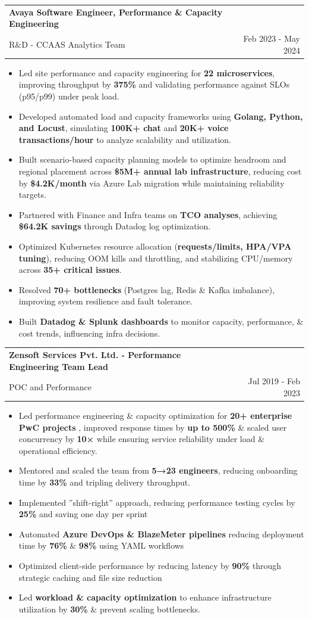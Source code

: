 \documentclass[letterpaper,11pt]{article}
\makeatletter
\newcommand{\resumeItem}[1]{
  \item\small{{#1 \vspace{-1pt}}}
}
\newcommand{\resumeSubheading}[4]{
  \vspace{-2pt}\item
  \begin{tabular*}{1.0\textwidth}[t]{l@{\extracolsep{\fill}}r}
    \textbf{\large#1} & \textbf{\small #2} \\
    \normalsize{\large#3} & \normalsize{\small #4} \\
  \end{tabular*}\vspace{-7pt}
}
\newcommand{\resumeItemListStart}{\begin{itemize}[leftmargin=0.1in]}
\newcommand{\resumeItemListEnd}{\end{itemize}\vspace{-12pt}}
\makeatother
\begin{document}
\resumeSubheading
  {Avaya Software Engineer, Performance \& Capacity Engineering }{}
  {R\&D - CCAAS Analytics Team}{Feb 2023 - May 2024}
\resumeItemListStart
  \resumeItem{\normalsize{Led site performance and capacity engineering for 
  \textbf{22 microservices}, improving throughput by \textbf{375\%} and 
  validating performance against SLOs (p95/p99) under peak load.}}
  \resumeItem{\normalsize{Developed automated load and capacity frameworks 
  using \textbf{Golang, Python, and Locust}, simulating \textbf{100K+ chat} 
  and \textbf{20K+ voice transactions/hour} to analyze scalability and utilization.}}
  \resumeItem{\normalsize{Built scenario-based capacity planning models to optimize headroom 
  and regional placement across \textbf{\$5M+ annual lab infrastructure}, 
  reducing cost by \textbf{\$4.2K/month} via Azure Lab migration while 
  maintaining reliability targets.}}
  \resumeItem{\normalsize{Partnered with Finance and Infra teams 
  on \textbf{TCO analyses}, achieving \textbf{\$64.2K savings} 
  through Datadog log optimization.}}
  \resumeItem{\normalsize{Optimized Kubernetes resource allocation 
  (\textbf{requests/limits, HPA/VPA tuning}), reducing OOM kills and throttling, 
  and stabilizing CPU/memory across \textbf{35+ critical issues}.}}
  \resumeItem{\normalsize{Resolved \textbf{70+ bottlenecks} 
  (Postgres lag, Redis \& Kafka imbalance), improving 
  system resilience and fault tolerance.}}
  \resumeItem{\normalsize{Built \textbf{Datadog \& Splunk dashboards} 
  to monitor capacity, performance, \& cost trends, influencing infra 
   decisions.}}
\resumeItemListEnd

\vspace{6pt}

\resumeSubheading
  {Zensoft Services Pvt. Ltd. - Performance Engineering Team Lead}{}
  {POC and Performance}{Jul 2019 - Feb 2023}
\resumeItemListStart
  \resumeItem{\normalsize{Led performance engineering \& capacity optimization for 
  \textbf{20+ enterprise PwC projects }, 
  improved response times by \textbf{up to 500\%} \& 
  scaled user concurrency by \textbf{10×} while ensuring service reliability under load \& operational efficiency.}}
  \resumeItem{\normalsize{Mentored and scaled the team from \textbf{5→23 engineers},
   reducing onboarding time by \textbf{33\%} and tripling delivery throughput.}}
  \resumeItem{\normalsize{Implemented ”shift-right” approach, reducing performance 
  testing cycles by \textbf{25\%} and saving one day per sprint}}
  \resumeItem{\normalsize{Automated \textbf{Azure DevOps \& BlazeMeter pipelines} 
  reducing deployment time by \textbf{76\%} \& \textbf{98\%} using YAML workflows}}
  \resumeItem{\normalsize{Optimized client-side performance by reducing
  latency by \textbf{90\%} through strategic caching and file size
  reduction}}
  \resumeItem{\normalsize{Led \textbf{workload \& capacity optimization} to 
  enhance infrastructure utilization by \textbf{30\%} \& prevent scaling bottlenecks.}}
\resumeItemListEnd
\end{document}
